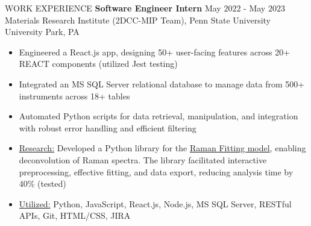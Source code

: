 \documentclass{resume} %
\begin{document}
\begin{rSection}{WORK EXPERIENCE}
{\bf Software Engineer Intern} \hfill May $2022$ - May $2023$\\
Materials Research Institute (2DCC-MIP Team), Penn State University \hfill University Park, PA
\begin{itemize}[itemsep = -4pt]
    \item Engineered a React.js app, designing 50+ user-facing features across 20+ REACT components (utilized Jest testing)
    \item Integrated an MS SQL Server relational database to manage data from 500+ instruments across 18+ tables
    \item Automated Python scripts for data retrieval, manipulation, and integration with robust error handling and efficient filtering
    \item \underline{Research:} Developed a Python library for the {\href{https://github.com/harshitjain17/Raman-Peak-Fitting-Model/}{Raman Fitting model}}, enabling deconvolution of Raman spectra. The library facilitated interactive preprocessing, effective fitting, and data export, reducing analysis time by 40\% (tested)
    \item \underline{Utilized:} Python, JavaScript, React.js, Node.js, MS SQL Server, RESTful APIs, Git, HTML/CSS, JIRA
\end{itemize}

\end{rSection} 


\end{document}
